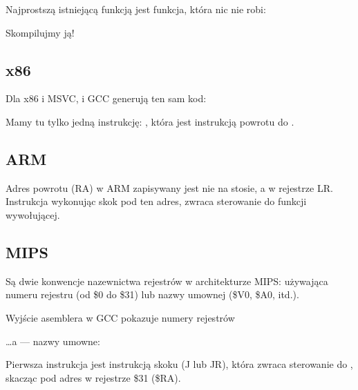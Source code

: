 \label{empty_func}

Najprostszą istniejącą funkcją jest funkcja, która nic nie robi:



Skompilujmy ją!

\subsection{x86}

Dla x86 i MSVC, i GCC generują ten sam kod:



Mamy tu tylko jedną instrukcję: \RET, która jest instrukcją powrotu do .

\subsection{ARM}



Adres powrotu (\ac{RA}) w ARM zapisywany jest nie na stosie, a w rejestrze \ac{LR}.
Instrukcja  wykonując skok pod ten adres, zwraca sterowanie do funkcji wywołującej.

\subsection{MIPS}

Są dwie konwencje nazewnictwa rejestrów w architekturze MIPS:
używająca numeru rejestru (od \$0 do \$31) lub nazwy umownej (\$V0, \$A0, itd.).

Wyjście asemblera w GCC pokazuje numery rejestrów



\dots a \IDA --- nazwy umowne:




Pierwsza instrukcja jest instrukcją skoku (J lub JR),
która zwraca sterowanie do , skacząc pod adres w rejestrze \$31 (\$RA).

